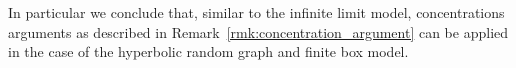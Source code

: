 In particular we conclude that, similar to the infinite limit model, concentrations arguments as described in Remark~\ref{rmk:concentration_argument} can be applied in the case of the hyperbolic random graph and finite box model.


